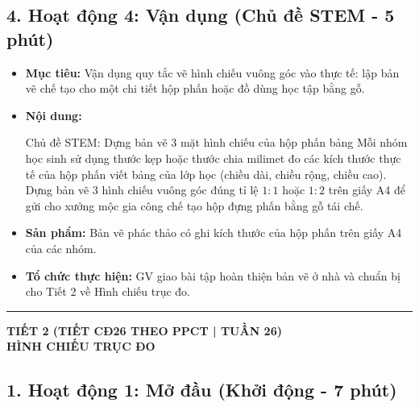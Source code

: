 \documentclass[12pt, a4paper]{article}
\begin{document}
\subsection*{4. Hoạt động 4: Vận dụng (Chủ đề STEM - 5 phút)}

\begin{itemize}[leftmargin=1.2cm]
    \item[a)] \textbf{Mục tiêu:} Vận dụng quy tắc vẽ hình chiếu vuông góc vào thực tế: lập bản vẽ chế tạo cho một chi tiết hộp phấn hoặc đồ dùng học tập bằng gỗ.
    \item[b)] \textbf{Nội dung:}
    \begin{stembox}{Chủ đề STEM: Dựng bản vẽ 3 mặt hình chiếu của hộp phấn bảng}
        Mỗi nhóm học sinh sử dụng thước kẹp hoặc thước chia milimet đo các kích thước thực tế của hộp phấn viết bảng của lớp học (chiều dài, chiều rộng, chiều cao). Dựng bản vẽ 3 hình chiếu vuông góc đúng tỉ lệ $1:1$ hoặc $1:2$ trên giấy A4 để gửi cho xưởng mộc gia công chế tạo hộp đựng phấn bằng gỗ tái chế.
    \end{stembox}
    \item[c)] \textbf{Sản phẩm:} Bản vẽ phác thảo có ghi kích thước của hộp phấn trên giấy A4 của các nhóm.
    \item[d)] \textbf{Tổ chức thực hiện:} GV giao bài tập hoàn thiện bản vẽ ở nhà và chuẩn bị cho Tiết 2 về Hình chiếu trục đo.
\end{itemize}

\vspace{10pt}
\hrule
\vspace{10pt}

\begin{center}
    \textbf{\large TIẾT 2 (TIẾT CĐ26 THEO PPCT | TUẦN 26)}\\[4pt]
    \textbf{\large HÌNH CHIẾU TRỤC ĐO}
\end{center}

\subsection*{1. Hoạt động 1: Mở đầu (Khởi động - 7 phút)}
\end{document}
